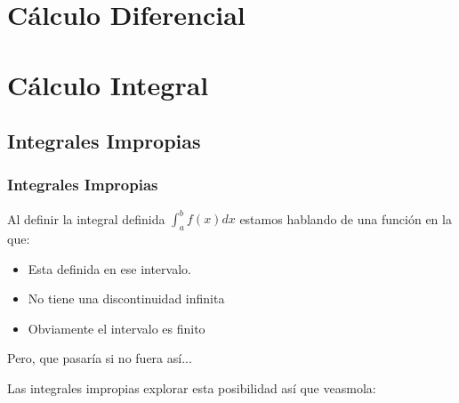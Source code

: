 \documentclass[12pt]{report}                                    %
\begin{document}
\part{Cálculo Diferencial}


\part{Cálculo Integral}




\chapter{Integrales Impropias}
    \clearpage

    \section{Integrales Impropias}

        Al definir la integral definida $\int_a^b f(x) dx$ estamos hablando
        de una función en la que:

        \begin{itemize}
            \item Esta definida en ese intervalo.
            \item No tiene una discontinuidad infinita
            \item Obviamente el intervalo es finito
        \end{itemize}

        Pero, que pasaría si no fuera así...

        Las integrales impropias explorar esta posibilidad así que veasmola:

    \clearpage
\end{document}
